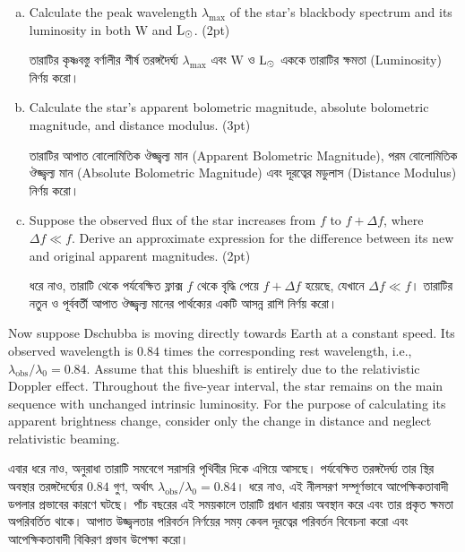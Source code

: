 \documentclass[10pt,a5paper,twoside]{article}
\newcommand{\m}[1]{%
	\unskip\nobreak\hfill
	\mbox{\normalfont(#1pt)}%
}
\begin{document}
\begin{enumerate}[a.]
	
	\item Calculate the peak wavelength $\lambda_{\max}$ of the star's blackbody spectrum and its luminosity in both $\mathrm{W}$ and $\rm L_\odot$. \m{2}
	
	তারাটির কৃষ্ণবস্তু বর্ণালীর শীর্ষ তরঙ্গদৈর্ঘ্য $\lambda_{\max}$ এবং $\mathrm{W}$ ও $\rm L_\odot$ এককে তারাটির ক্ষমতা (Luminosity) নির্ণয় করো।
	
	\item Calculate the star's apparent bolometric magnitude, absolute bolometric magnitude, and distance modulus. \m{3}
	
	তারাটির আপাত বোলোমিতিক ঔজ্জ্বল্য মান (Apparent Bolometric Magnitude), পরম বোলোমিতিক ঔজ্জ্বল্য মান (Absolute Bolometric Magnitude) এবং দূরত্বের মডুলাস (Distance Modulus) নির্ণয় করো।
	
	\item Suppose the observed flux of the star increases from $f$ to $f+\Delta f$, where $\Delta f\ll f$. Derive an approximate expression for the difference between its new and original apparent magnitudes. \m{2}
	
	ধরে নাও, তারাটি থেকে পর্যবেক্ষিত ফ্লাক্স $f$ থেকে বৃদ্ধি পেয়ে $f+\Delta f$ হয়েছে, যেখানে $\Delta f\ll f$। তারাটির নতুন ও পূর্ববর্তী আপাত ঔজ্জ্বল্য মানের পার্থক্যের একটি আসন্ন রাশি নির্ণয় করো।
	
\end{enumerate}

Now suppose Dschubba is moving directly towards Earth at a constant speed. Its observed wavelength is $0.84$ times the corresponding rest wavelength, i.e., $\lambda_{\mathrm{obs}}/\lambda_0=0.84$. Assume that this blueshift is entirely due to the relativistic Doppler effect. Throughout the five-year interval, the star remains on the main sequence with unchanged intrinsic luminosity. For the purpose of calculating its apparent brightness change, consider only the change in distance and neglect relativistic beaming.

এবার ধরে নাও, অনুরাধা তারাটি সমবেগে সরাসরি পৃথিবীর দিকে এগিয়ে আসছে। পর্যবেক্ষিত তরঙ্গদৈর্ঘ্য তার স্থির অবস্থার তরঙ্গদৈর্ঘ্যের $0.84$ গুণ, অর্থাৎ $\lambda_{\mathrm{obs}}/\lambda_0=0.84$। ধরে নাও, এই নীলসরণ সম্পূর্ণভাবে আপেক্ষিকতাবাদী ডপলার প্রভাবের কারণে ঘটছে। পাঁচ বছরের এই সময়কালে তারাটি প্রধান ধারায় অবস্থান করে এবং তার প্রকৃত ক্ষমতা অপরিবর্তিত থাকে। আপাত উজ্জ্বলতার পরিবর্তন নির্ণয়ের সময় কেবল দূরত্বের পরিবর্তন বিবেচনা করো এবং আপেক্ষিকতাবাদী বিকিরণ প্রভাব উপেক্ষা করো।
\end{document}
